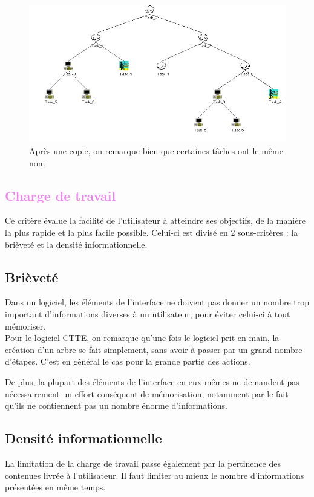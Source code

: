\documentclass[12pt, a4paper]{article}
\begin{document}
\begin{figure}[h]
\begin{center}
   \includegraphics[scale = 0.5]{copierate.jpg}
	\caption{Après une copie, on remarque bien que certaines tâches ont le même nom}
	\end{center}
\end{figure}
\newpage
\textcolor{Violet}{\section{Charge de travail}}
Ce critère évalue la facilité de l'utilisateur à atteindre ses objectifs, de la manière la plus rapide et la plus facile possible. Celui-ci est divisé en 2 sous-critères : la brièveté et la densité informationnelle.

\textcolor{NavyBlue}{\subsection{Brièveté}}
Dans un logiciel, les éléments de l'interface ne doivent pas donner un nombre trop important d'informations diverses à un utilisateur, pour éviter celui-ci à tout mémoriser.\\


Pour le logiciel CTTE, on remarque qu'une fois le logiciel prit en main, la création d'un arbre se fait simplement, sans avoir à passer par un grand nombre d'étapes. C'est en général le cas pour la grande partie des actions. 


De plus, la plupart des éléments de l'interface en eux-mêmes ne demandent pas nécessairement un effort conséquent de mémorisation, notamment par le fait qu'ils ne contiennent pas un nombre énorme d'informations.

\textcolor{NavyBlue}{\subsection{Densité informationnelle}}
La limitation de la charge de travail passe également par la pertinence des contenues livrée à l'utilisateur. Il faut limiter au mieux le nombre d'informations présentées en même temps.\\
\end{document}
